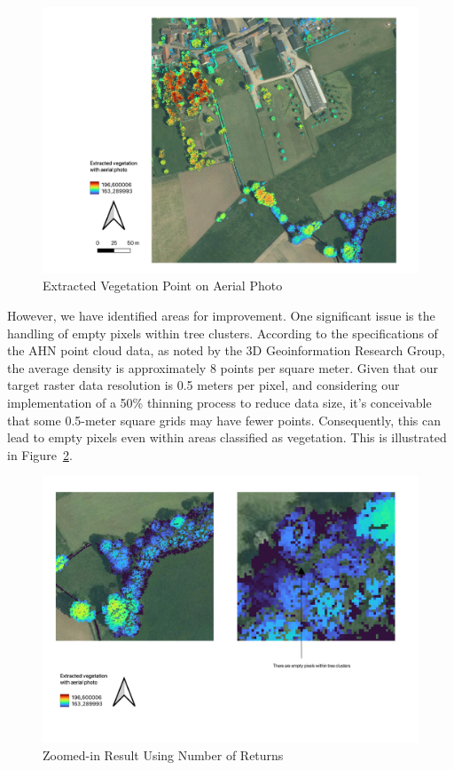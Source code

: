 \documentclass{article}
\begin{document}
\begin{figure}[H]
    \centering
    \includegraphics[width=0.7\linewidth]{Figures/vegetation on aerial.png}
    \caption{Extracted Vegetation Point on Aerial Photo}
    \label{vegwithaerial}
\end{figure}

\noindent However, we have identified areas for improvement. One significant issue is the handling of empty pixels within tree clusters. According to the specifications of the AHN point cloud data, as noted by the 3D Geoinformation Research Group, the average density is approximately 8 points per square meter. Given that our target raster data resolution is 0.5 meters per pixel, and considering our implementation of a 50\% thinning process to reduce data size, it's conceivable that some 0.5-meter square grids may have fewer points. Consequently, this can lead to empty pixels even within areas classified as vegetation. This is illustrated in Figure~\ref{numofreturnsimprovement}.\\

\begin{figure}[H]
    \centering
    \includegraphics[width=0.7\linewidth]{Figures/numofreturnimprovment.png}
    \caption{Zoomed-in Result Using Number of Returns}
    \label{numofreturnsimprovement}
\end{figure}
\end{document}
